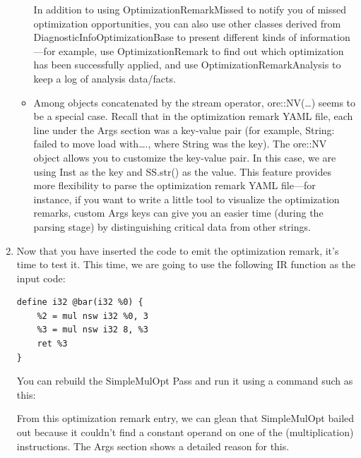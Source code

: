 \begin{enumerate}
\begin{itemize}
In addition to using OptimizationRemarkMissed to notify you of missed optimization opportunities, you can also use other classes derived from DiagnosticInfoOptimizationBase to present different kinds of information—for example, use OptimizationRemark to find out which optimization has been successfully applied, and use OptimizationRemarkAnalysis to keep a log of analysis data/facts.

\item Among objects concatenated by the stream operator, ore::NV(…) seems to be a special case. Recall that in the optimization remark YAML file, each line under the Args section was a key-value pair (for example, String: failed to move load with…., where String was the key). The ore::NV object allows you to customize the key-value pair. In this case, we are using Inst as the key and SS.str() as the value. This feature provides more flexibility to parse the optimization remark YAML file—for instance, if you want to write a little tool to visualize the optimization remarks, custom Args keys can give you an easier time (during the parsing stage) by distinguishing critical data from other strings.

\end{itemize}

\item Now that you have inserted the code to emit the optimization remark, it's time to test it. This time, we are going to use the following IR function as the input code:

\begin{lstlisting}[style=styleCXX]
define i32 @bar(i32 %0) {
	%2 = mul nsw i32 %0, 3
	%3 = mul nsw i32 8, %3
	ret %3
}
\end{lstlisting}

You can rebuild the SimpleMulOpt Pass and run it using a command such as this:


From this optimization remark entry, we can glean that SimpleMulOpt bailed out because it couldn't find a constant operand on one of the (multiplication) instructions. The Args section shows a detailed reason for this.


\end{enumerate}
